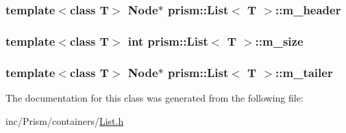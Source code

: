\subsubsection[{\texorpdfstring{m\+\_\+header}{m_header}}]{\setlength{\rightskip}{0pt plus 5cm}template$<$class T$>$ Node$\ast$ {\bf prism\+::\+List}$<$ T $>$\+::m\+\_\+header\hspace{0.3cm}{\ttfamily [protected]}}\hypertarget{classprism_1_1_list_ade9dd1234d468fdcbcddb16eb490d296}{}\label{classprism_1_1_list_ade9dd1234d468fdcbcddb16eb490d296}
\subsubsection[{\texorpdfstring{m\+\_\+size}{m_size}}]{\setlength{\rightskip}{0pt plus 5cm}template$<$class T$>$ int {\bf prism\+::\+List}$<$ T $>$\+::m\+\_\+size\hspace{0.3cm}{\ttfamily [protected]}}\hypertarget{classprism_1_1_list_ae86f48e50ec12239597de98deb36b4a4}{}\label{classprism_1_1_list_ae86f48e50ec12239597de98deb36b4a4}
\subsubsection[{\texorpdfstring{m\+\_\+tailer}{m_tailer}}]{\setlength{\rightskip}{0pt plus 5cm}template$<$class T$>$ Node$\ast$ {\bf prism\+::\+List}$<$ T $>$\+::m\+\_\+tailer\hspace{0.3cm}{\ttfamily [protected]}}\hypertarget{classprism_1_1_list_a0740989f0d5af2bad19850fac850947e}{}\label{classprism_1_1_list_a0740989f0d5af2bad19850fac850947e}


The documentation for this class was generated from the following file\+:\begin{DoxyCompactItemize}
\item 
inc/\+Prism/containers/\hyperlink{_list_8h}{List.\+h}\end{DoxyCompactItemize}
